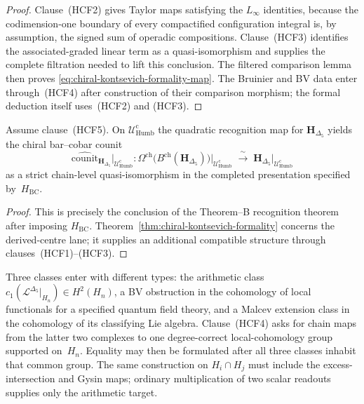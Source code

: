 \begin{proof}
Clause~\textup{(HCF2)} gives Taylor maps satisfying the
$L_\infty$ identities, because the codimension-one boundary of every
compactified configuration integral is, by assumption, the signed sum
of operadic compositions.  Clause~\textup{(HCF3)} identifies the
associated-graded linear term as a quasi-isomorphism and supplies the
complete filtration needed to lift this conclusion.  The filtered
comparison lemma then proves
\eqref{eq:chiral-kontsevich-formality-map}.  The Bruinier and BV data
enter through~\textup{(HCF4)} after construction of their comparison
morphism; the formal deduction itself uses~\textup{(HCF2)} and
\textup{(HCF3)}.
\end{proof}

\begin{corollary}
\label{cor:bar-cobar-inversion-from-formality}
%
\ClaimStatusConditional
Assume clause~\textup{(HCF5)}.  On
$\mathcal U_{\mathrm{Humb}}^{\mathrm{c}}$ the quadratic recognition
map for $\mathbf H_{\Delta_5}$ yields the chiral bar--cobar counit
\[
\widehat{\mathrm{counit}}_{\mathbf H_{\Delta_5}}
\big|_{\mathcal U_{\mathrm{Humb}}^{\mathrm{c}}}\colon
\Omega^{\mathrm{ch}}\bigl(B^{\mathrm{ch}}(\mathbf H_{\Delta_5})\bigr)
\big|_{\mathcal U_{\mathrm{Humb}}^{\mathrm{c}}}
\;\xrightarrow{\;\sim\;}\;
\mathbf H_{\Delta_5}\big|_{\mathcal U_{\mathrm{Humb}}^{\mathrm{c}}}
\]
as a strict chain-level quasi-isomorphism in the completed presentation
specified by~$H_{\mathrm{BC}}$.
\end{corollary}

\begin{proof}
This is precisely the conclusion of the Theorem--B recognition theorem
after imposing $H_{\mathrm{BC}}$.  Theorem~\ref{thm:chiral-kontsevich-formality}
concerns the derived-centre lane; it supplies an additional compatible
structure through clauses~\textup{(HCF1)}--\textup{(HCF3)}.
\end{proof}

\begin{remark}
\label{rem:formality-obstruction-malcev-ladder}
%
Three classes enter with different types: the arithmetic class
$c_1(\mathcal L^{\Delta_5}|_{H_n})\in H^2(H_n)$, a BV obstruction in
the cohomology of local functionals for a specified quantum field
theory, and a Malcev extension class in the cohomology of its
classifying Lie algebra.  Clause~\textup{(HCF4)} asks for chain maps
from the latter two complexes to one degree-correct local-cohomology
group supported on~$H_n$.  Equality may then be formulated after all
three classes inhabit that common group.  The same construction on
$H_i\cap H_j$ must include the excess-intersection and Gysin maps;
ordinary multiplication of two scalar readouts supplies only the
arithmetic target.
\end{remark}

